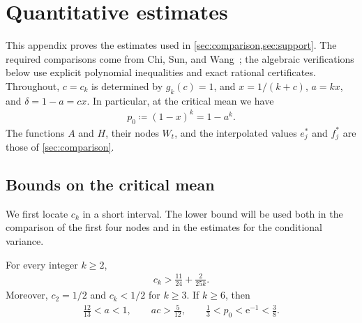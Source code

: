 \section{Quantitative estimates}\label{sec:estimates}

This appendix proves the estimates used in \cref{sec:comparison,sec:support}. The required comparisons come from Chi, Sun, and Wang~\cite[Sections 3--4 and Appendix A]{CSW2026}; the algebraic verifications below use explicit polynomial inequalities and exact rational certificates. Throughout, $c=c_k$ is determined by $g_k(c)=1$, and $x=1/(k+c)$, $a=kx$, and $\delta=1-a=cx$. In particular, at the critical mean we have
\begin{align*}
p_0\coloneqq(1-x)^k=1-a^k.
\end{align*}
The functions $A$ and $H$, their nodes $W_t$, and the interpolated values $e_j^*$ and $f_j^*$ are those of \cref{sec:comparison}.

\subsection{Bounds on the critical mean}

We first locate $c_k$ in a short interval. The lower bound will be used both in the comparison of the first four nodes and in the estimates for the conditional variance.

\begin{lemma}\label{lem:crossing-bounds}
For every integer $k\ge2$,
\begin{align}\label{eq:appendix-crossing}
c_k>\frac{11}{24}+\frac{2}{25k}.
\end{align}
Moreover, $c_2=1/2$ and $c_k<1/2$ for $k\ge3$. If $k\ge6$, then
\begin{align}\label{eq:appendix-elementary-bounds}
\frac{12}{13}<a<1,\qquad ac>\frac5{12},\qquad \frac13<p_0<\mathrm e^{-1}<\frac38.
\end{align}
\end{lemma}

